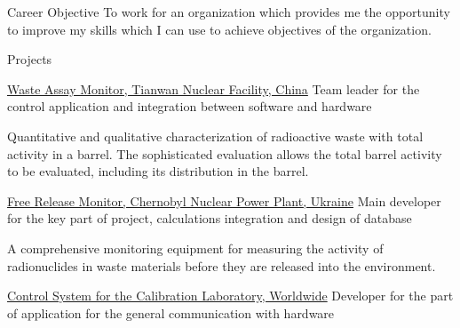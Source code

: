 \documentclass{cv} %
\begin{document}
\begin{rSection}{Career Objective}
 To work for an organization which provides me the opportunity to improve my skills which I can use to achieve objectives of the organization.
\end{rSection}
\begin{rSection}{Projects}
\begin{rSubsection}
{\href{https://www.vfnuclear.com/en/products/waste-assay-monitor}{Waste Assay Monitor, Tianwan Nuclear Facility, China}}{}
{Team leader for the control application and integration between software and hardware}{}

Quantitative and qualitative characterization of radioactive waste with total activity in a barrel. The sophisticated evaluation allows the total barrel activity to be evaluated, including its distribution in the barrel.
\end{rSubsection}

\begin{rSubsection}
{\href{https://www.vfnuclear.com/en/free-release-monitor-frm-03-delivery-for-chernobyl-npp}{Free Release Monitor, Chernobyl Nuclear Power Plant, Ukraine}}{}
{Main developer for the key part of project, calculations integration and design of database}{}

A comprehensive monitoring equipment for measuring the activity of radionuclides in waste materials before they are released into the environment.
\end{rSubsection}



\begin{rSubsection}
{\href{https://www.vf.cz/en/products/dars-control-system-for-the-calibration-laboratory-dars}{Control System for the Calibration Laboratory, Worldwide}}{}
{Developer for the part of application for the general communication with hardware}{}


\end{rSubsection}
\end{rSection}
\end{document}
